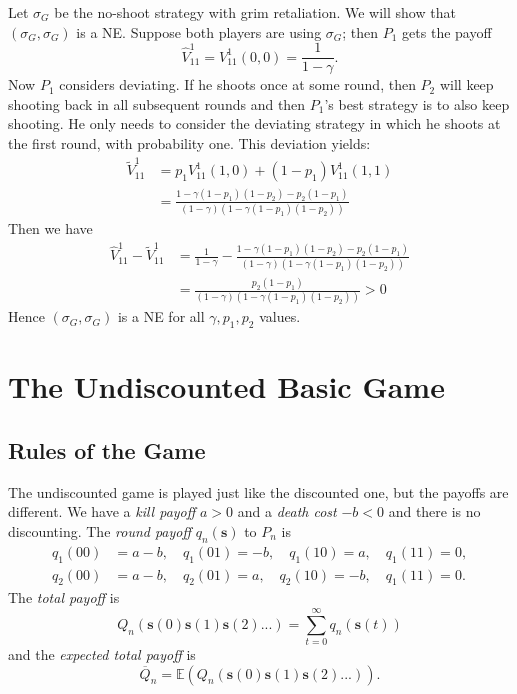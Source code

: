 \documentclass{article}%
\numberwithin{equation}{section}
\begin{document}
Let $\sigma_{G}$ be the no-shoot strategy with grim retaliation. We will show
that $\left(  \sigma_{G},\sigma_{G}\right)  $ is a NE. Suppose both players
are using $\sigma_{G}$; then $P_{1}$ gets the payoff
\[
\widehat{V}_{11}^{1}=V_{11}^{1}\left(  0,0\right)  =\frac{1}{1-\gamma}.
\]
Now $P_{1}$ considers deviating. If he shoots once at some round, then $P_{2}$
will keep shooting back in all subsequent rounds and then $P_{1}$'s best
strategy is to also keep shooting. He only needs to consider the deviating
strategy in which he shoots at the first round, with probability one. This
deviation yields:
\begin{align*}
\widetilde{V}_{11}^{1}  &  =p_{1}V_{11}^{1}\left(  1,0\right)  +\left(
1-p_{1}\right)  V_{11}^{1}\left(  1,1\right) \\
&  =\frac{1-\gamma\left(  1-p_{1}\right)  \left(  1-p_{2}\right)
-p_{2}\left(  1-p_{1}\right)  }{\left(  1-\gamma\right)  \left(
1-\gamma\left(  1-p_{1}\right)  \left(  1-p_{2}\right)  \right)  }%
\end{align*}
Then we have%
\begin{align*}
\widehat{V}_{11}^{1}-\widetilde{V}_{11}^{1}  &  =\frac{1}{1-\gamma}%
-\frac{1-\gamma\left(  1-p_{1}\right)  \left(  1-p_{2}\right)  -p_{2}\left(
1-p_{1}\right)  }{\left(  1-\gamma\right)  \left(  1-\gamma\left(
1-p_{1}\right)  \left(  1-p_{2}\right)  \right)  }\\
&  =\allowbreak\frac{p_{2}\left(  1-p_{1}\right)  }{\left(  1-\gamma\right)
\left(  1-\gamma\left(  1-p_{1}\right)  \left(  1-p_{2}\right)  \right)  }>0
\end{align*}
Hence $\left(  \sigma_{G},\sigma_{G}\right)  $ is a NE for all $\gamma
,p_{1},p_{2}$ values.

\section{The Undiscounted Basic Game}

\subsection{Rules of the Game\noindent}

The undiscounted game is played just like the discounted one, but the payoffs
are different. We have a \emph{kill payoff} $a>0$ and a \emph{death cost}
$-b<0$ and there is no discounting. The \emph{round payoff} $q_{n}\left(
\mathbf{s}\right)  $ to $P_{n}$ is%
\begin{align*}
q_{1}\left(  00\right)   &  =a-b,\quad q_{1}\left(  01\right)  =-b,\quad
q_{1}\left(  10\right)  =a,\quad q_{1}\left(  11\right)  =0,\\
q_{2}\left(  00\right)   &  =a-b,\quad q_{2}\left(  01\right)  =a,\quad
q_{2}\left(  10\right)  =-b,\quad q_{1}\left(  11\right)  =0.
\end{align*}
The \emph{total payoff} is%
\[
Q_{n}\left(  \mathbf{s}\left(  0\right)  \mathbf{s}\left(  1\right)
\mathbf{s}\left(  2\right)  ...\right)  =\sum_{t=0}^{\infty}q_{n}\left(
\mathbf{s}\left(  t\right)  \right)
\]
and the \emph{expected total payoff} is%
\[
\overline{Q}_{n}=\mathbb{E}\left(  Q_{n}\left(  \mathbf{s}\left(  0\right)
\mathbf{s}\left(  1\right)  \mathbf{s}\left(  2\right)  ...\right)  \right)
.
\]
\end{document}
